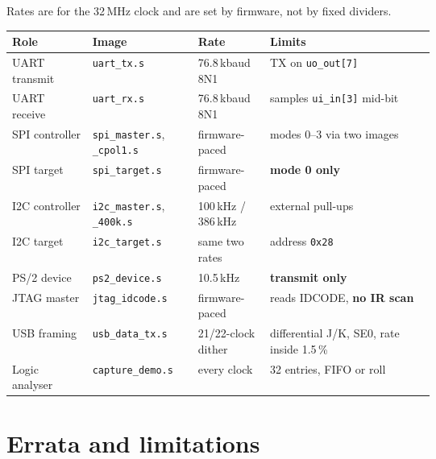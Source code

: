 \documentclass[10pt,a4paper]{article}
\begin{document}
Rates are for the 32\,MHz clock and are set by firmware, not by fixed dividers.

\begin{center}
\begin{tabularx}{\linewidth}{@{}L{0.19\linewidth}L{0.25\linewidth}L{0.17\linewidth}X@{}}
\toprule
\textbf{Role} & \textbf{Image} & \textbf{Rate} & \textbf{Limits}\\
\midrule
UART transmit & \texttt{uart\_tx.s} & 76.8\,kbaud 8N1 & TX on \texttt{uo\_out[7]}\\
UART receive & \texttt{uart\_rx.s} & 76.8\,kbaud 8N1 & samples \texttt{ui\_in[3]} mid-bit\\
SPI controller & \texttt{spi\_master.s}, \texttt{\_cpol1.s} & firmware-paced & modes 0--3 via two images\\
SPI target & \texttt{spi\_target.s} & firmware-paced & \textbf{mode 0 only}\\
I2C controller & \texttt{i2c\_master.s}, \texttt{\_400k.s} & 100\,kHz / 386\,kHz & external pull-ups\\
I2C target & \texttt{i2c\_target.s} & same two rates & address \texttt{0x28}\\
PS/2 device & \texttt{ps2\_device.s} & 10.5\,kHz & \textbf{transmit only}\\
JTAG master & \texttt{jtag\_idcode.s} & firmware-paced & reads IDCODE, \textbf{no IR scan}\\
USB framing & \texttt{usb\_data\_tx.s} & 21/22-clock dither & differential J/K, SE0, rate inside 1.5\,\%\\
Logic analyser & \texttt{capture\_demo.s} & every clock & 32 entries, FIFO or roll\\
\bottomrule
\end{tabularx}
\end{center}

\section{Errata and limitations}
\end{document}
